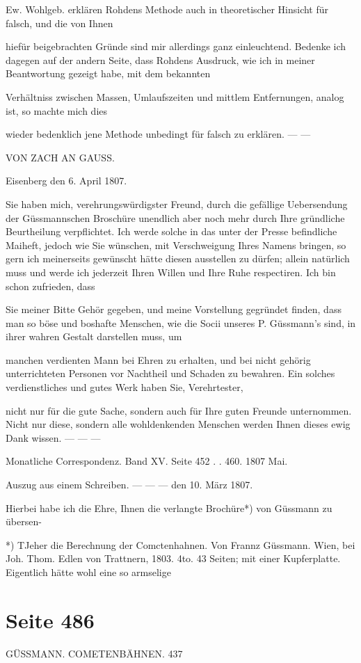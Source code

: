 \documentclass[10pt,a4paper]{article}
\begin{document}
Ew. Wohlgeb. erklären Rohdens Methode auch in theoretischer Hinsicht für falsch, und die von Ihnen

hiefür beigebrachten Gründe sind mir allerdings ganz einleuchtend. Bedenke ich dagegen auf der andern Seite, dass Rohdens Ausdruck, wie ich in meiner Beantwortung gezeigt habe, mit dem bekannten

Verhältniss zwischen Massen, Umlaufszeiten und mittlem Entfernungen, analog ist, so machte mich dies

wieder bedenklich jene Methode unbedingt für falsch zu erklären. — —

VON ZACH AN GAUSS.

Eisenberg den 6. April 1807.

Sie haben mich, verehrungswürdigster Freund, durch die gefällige Uebersendung der Güssmannschen Broschüre unendlich aber noch mehr durch Ihre gründliche Beurtheilung verpflichtet. Ich werde solche in das unter der Presse befindliche Maiheft, jedoch wie Sie wünschen, mit Verschweigung Ihres Namens bringen, so gern ich meinerseits gewünscht hätte diesen ausstellen zu dürfen; allein natürlich muss und werde ich jederzeit Ihren Willen und Ihre Ruhe respectiren. Ich bin schon zufrieden, dass

Sie meiner Bitte Gehör gegeben, und meine Vorstellung gegründet finden, dass man so böse und boshafte Menschen, wie die Socii unseres P. Güssmann's sind, in ihrer wahren Gestalt darstellen muss, um

manchen verdienten Mann bei Ehren zu erhalten, und bei nicht gehörig unterrichteten Personen vor Nachtheil und Schaden zu bewahren. Ein solches verdienstliches und gutes Werk haben Sie, Verehrtester,

nicht nur für die gute Sache, sondern auch für Ihre guten Freunde unternommen. Nicht nur diese, sondern alle wohldenkenden Menschen werden Ihnen dieses ewig Dank wissen. — — —

Monatliche Correspondenz. Band XV. Seite 452 . . 460. 1807 Mai.

Auszug aus einem Schreiben. — — — den 10. März 1807.

Hierbei habe ich die Ehre, Ihnen die verlangte Brochüre*) von Güssmann zu übersen-

*) TJeher die Berechnung der Comctenhahnen. Von Frannz Güssmann. Wien, bei Joh. Thom. Edlen von Trattnern, 1803. 4to. 43 Seiten; mit einer Kupferplatte. Eigentlich hätte wohl eine so armselige


\newpage
\section*{Seite 486}
GÜSSMANN. COMETENBÄHNEN. 437
\end{document}
